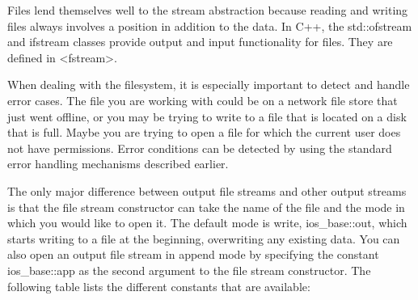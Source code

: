 
Files lend themselves well to the stream abstraction because reading and writing files always involves a position in addition to the data. In C++, the std::ofstream and ifstream classes provide output and input functionality for files. They are defined in <fstream>.

When dealing with the filesystem, it is especially important to detect and handle error cases. The file you are working with could be on a network file store that just went offline, or you may be trying to write to a file that is located on a disk that is full. Maybe you are trying to open a file for which the current user does not have permissions. Error conditions can be detected by using the standard error handling mechanisms described earlier.

The only major difference between output file streams and other output streams is that the file stream constructor can take the name of the file and the mode in which you would like to open it. The default mode is write, ios\_base::out, which starts writing to a file at the beginning, overwriting any existing data. You can also open an output file stream in append mode by specifying the constant ios\_base::app as the second argument to the file stream constructor. The following table lists the different constants that are available:

